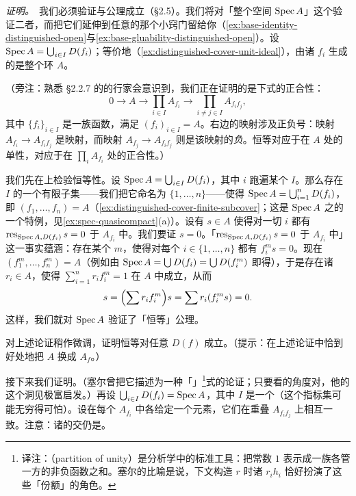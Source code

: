 \emph{证明。}\ 我们必须验证\trBase\trIdentityAxiom{}与\trBase\trGluability{}公理成立（\S2.5）。我们将对「整个空间 $\operatorname{Spec} A$」这个\trOpenSet{}验证二者，而把它们延伸到任意\trDistinguishedOpen{}的那个小窍门留给你（\cref{ex:base-identity-distinguished-open}与\cref{ex:base-gluability-distinguished-open}）。设 $\operatorname{Spec} A=\bigcup_{i\in I}D(f_i)$；等价地（\cref{ex:distinguished-cover-unit-ideal}），由诸 $f_i$ 生成的\trIdeal{}是整个环 $A$。

（旁注：熟悉 \S2.2.7 的\trEqualizer{}\trExactSequence{}的行家会意识到，我们正在证明的是下式的正合性：
\begin{equation*}\tag{4.1.3.1}\label{eq:equalizer-structure-sheaf}
0\longrightarrow A\longrightarrow\prod_{i\in I}A_{f_i}\longrightarrow\prod_{i\neq j\in I}A_{f_i f_j},
\end{equation*}
其中 $\{f_i\}_{i\in I}$ 是一族函数，满足 $(f_i)_{i\in I}=A$。右边的映射涉及正负号：映射 $A_{f_i}\to A_{f_i f_j}$ 是\trLocalization{}映射，而映射 $A_{f_j}\to A_{f_i f_j}$ 则是该\trLocalization{}映射的\emph{负}。\trBase{}恒等对应于在 $A$ 处的单性，\trGluability{}对应于在 $\prod_i A_{f_i}$ 处的正合性。）

我们先在\trBase{}上检验恒等性。设 $\operatorname{Spec} A=\bigcup_{i\in I}D(f_i)$，其中 $i$ 跑遍某个\trIndexSet{} $I$。那么存在 $I$ 的一个有限子集——我们把它命名为 $\{1,\dots,n\}$——使得 $\operatorname{Spec} A=\bigcup_{i=1}^{n}D(f_i)$，即 $(f_1,\dots,f_n)=A$（\cref{ex:distinguished-cover-finite-subcover}；这是 $\operatorname{Spec} A$ 之\trQuasicompactness{}的一个特例，见\cref{ex:spec-quasicompact}(a)）。设有 $s\in A$ 使得对一切 $i$ 都有 $\mathrm{res}_{\operatorname{Spec} A,D(f_i)}\,s=0$ 于 $A_{f_i}$ 中。我们要证 $s=0$。「$\mathrm{res}_{\operatorname{Spec} A,D(f_i)}\,s=0$ 于 $A_{f_i}$ 中」这一事实蕴涵：存在某个 $m$，使得对每个 $i\in\{1,\dots,n\}$ 都有 $f_i^{m}s=0$。现在 $(f_1^{m},\dots,f_n^{m})=A$（例如由 $\operatorname{Spec} A=\bigcup D(f_i)=\bigcup D(f_i^{m})$ 即得），于是存在诸 $r_i\in A$，使得 $\sum_{i=1}^{n}r_if_i^{m}=1$ 在 $A$ 中成立，从而
\[
s=\Bigl(\sum r_if_i^{m}\Bigr)s=\sum r_i(f_i^{m}s)=0.
\]
这样，我们就对 $\operatorname{Spec} A$ 验证了「\trBase{}恒等」公理。

\begin{exercise}\label{ex:base-identity-distinguished-open}
对上述论证稍作微调，证明\trBase{}恒等对任意\trDistinguishedOpen{} $D(f)$ 成立。（提示：在上述论证中恰到好处地把 $A$ 换成 $A_f$。）
\end{exercise}

接下来我们证明\trBase\trGluability。（塞尔曾把它描述为一种「\trPartitionOfUnity{}」\footnote{译注：\trPartitionOfUnity{}（partition of unity）是分析学中的标准工具：把常数 $1$ 表示成一族各管一方的非负函数之和。塞尔的比喻是说，下文构造 $r$ 时诸 $r_ih_i$ 恰好扮演了这些「份额」的角色。}式的论证；只要看的角度对，他的这个洞见极富启发。）再设 $\bigcup_{i\in I}D(f_i)=\operatorname{Spec} A$，其中 $I$ 是一个\trIndexSet{}（这个指标集可能无穷得可怕）。设在每个 $A_{f_i}$ 中各给定一个元素，它们在重叠 $A_{f_i f_j}$ 上相互一致。注意：诸\trDistinguishedOpen{}的交仍是\trDistinguishedOpen。


